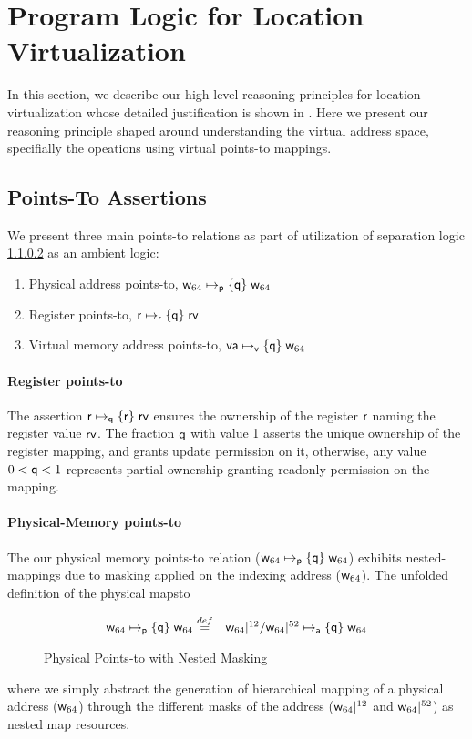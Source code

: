 \section{Program Logic for Location Virtualization}
\label{sec:logic}
In this section, we describe our high-level reasoning principles for location virtualization whose detailed justification is shown in . Here we present our reasoning principle shaped around understanding the virtual address space, specifially the opeations using virtual points-to mappings.
\subsection{Points-To Assertions}
\label{sec:pointsto}

We present three main points-to relations as part of utilization of separation logic \ref{} as an ambient logic:
\begin{enumerate}
\item Physical address points-to, $\mathsf{w}_{64}\mapsto_{\mathsf{p}}\{\mathsf{q}\}\;\mathsf{w}_{64}$
\item Register points-to, $\mathsf{r}\mapsto_{\mathsf{r}}\{\mathsf{q}\}\;\mathsf{rv}$
\item Virtual memory address points-to, $\mathsf{va}\mapsto_{\mathsf{v}}\{\mathsf{q}\}\;\mathsf{w}_{64}$
\end{enumerate}
\paragraph{Register points-to} The assertion $\mathsf{r}\mapsto_{\mathsf{q}}\{\mathsf{r}\}\;\mathsf{rv}$ ensures the ownership of the register $\mathsf{r}$ naming the register value $\mathsf{rv}$. The fraction $\mathsf{q}$ with value 1 asserts the unique ownership of the register mapping, and grants update permission on it, otherwise, any value $0 < \mathsf{q} <1$ represents partial ownership granting readonly permission on the mapping.
\paragraph{Physical-Memory points-to} The our physical memory points-to relation ($\mathsf{w}_{64}\mapsto_{\mathsf{p}}\{\mathsf{q}\}\;\mathsf{w}_{64}$) exhibits nested-mappings due to masking applied on the indexing address ($\mathsf{w}_{64}$). The unfolded definition of the physical mapsto 
\begin{figure}[!ht]
\[
\begin{array}{cl}
\mathsf{w}_{64}\mapsto_{\mathsf{p}}\{\mathsf{q}\}\;\mathsf{w}_{64} \stackrel{def}{=} & \mathsf{w}_{64}|^{12} / \mathsf{w}_{64}|^{52} \mapsto_{\mathsf{a}}\{\mathsf{q}\}\;\mathsf{w}_{64}
\end{array}
\]
\caption{Physical Points-to with Nested Masking}
  \label{fig:physicalpointsto}
\end{figure}
where we simply abstract the generation of hierarchical mapping of a physical address ($\mathsf{w}_{64}$) through the different masks of the address ($\mathsf{w}_{64}|^{12}$ and $\mathsf{w}_{64}|^{52}$) as nested map resources.
